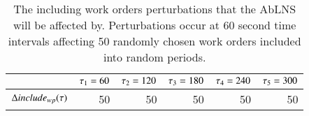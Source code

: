 \begin{table}[H]
	\centering
	\begin{tabular}{lrrrrr}
	\toprule
	                                & $\tau_1 = 60$ & $\tau_2 = 120$ & $\tau_3 = 180$ & $\tau_4 = 240$ & $\tau_5 = 300$ \\ \midrule
	$\Delta include_{wp}(\tau)$ & 50                    & 50                     & 50                     & 50                     & 50                     \\ \bottomrule
	\end{tabular}
	\caption{The including work orders perturbations that the AbLNS will be affected by. 
		Perturbations occur at 60 second time intervals affecting 50 randomly chosen work orders included into random periods.
	}\label{tab:responses:inclusion}
\end{table}
